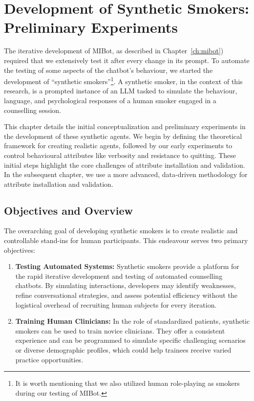 \chapter{Development of Synthetic Smokers: Preliminary Experiments}
\label{ch:synthetic-smoker-preliminary}

The iterative development of MIBot, as described in Chapter~\ref{ch:mibot}) required that we extensively test it after every change in its prompt. To automate the testing of some aspects of the chatbot's behaviour, we started the development of ``synthetic smokers''\footnote{It is worth mentioning that we also utilized human role-playing as smokers during our testing of MIBot.}. A synthetic smoker, in the context of this research, is a prompted instance of an LLM tasked to simulate the behaviour, language, and psychological responses of a human smoker engaged in a counselling session.

This chapter details the initial conceptualization and preliminary experiments in the development of these synthetic agents. We begin by defining the theoretical framework for creating realistic agents, followed by our early experiments to control behavioural attributes like verbosity and resistance to quitting. These initial steps highlight the core challenges of attribute installation and validation. In the subsequent chapter, we use a more advanced,  data-driven methodology for attribute installation and validation.

\section{Objectives and Overview}
\label{sec:synthetic-smoker-goals}

The overarching goal of developing synthetic smokers is to create realistic and controllable stand-ins for human participants. This endeavour serves two primary objectives:

\begin{enumerate}
    \item \textbf{Testing Automated Systems:} Synthetic smokers provide a platform for the rapid iterative development and testing of automated counselling chatbots. By simulating interactions, developers may identify weaknesses, refine conversational strategies, and assess potential efficiency without the logistical overhead of recruiting human subjects for every iteration.
    \item \textbf{Training Human Clinicians:} In the role of standardized patients, synthetic smokers can be used to train novice clinicians. They offer a consistent experience and can be programmed to simulate specific challenging scenarios or diverse demographic profiles, which could help trainees receive varied practice opportunities.
\end{enumerate}

